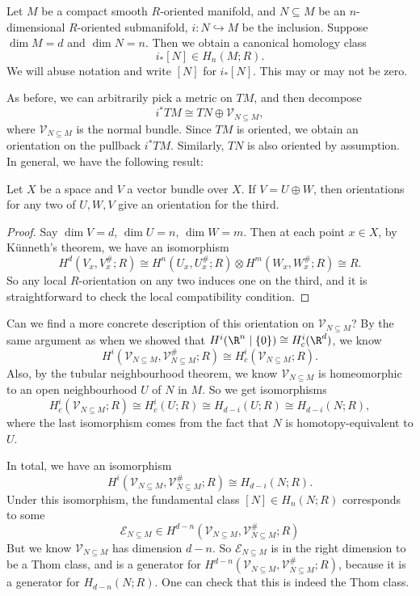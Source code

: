 \documentclass[a4paper]{article}
\theoremstyle{definition}
\begin{document}
Let $M$ be a compact smooth $R$-oriented manifold, and $N \subseteq M$ be an $n$-dimensional $R$-oriented submanifold, $i: N \hookrightarrow M$ be the inclusion. Suppose $\dim M = d$ and $\dim N = n$. Then we obtain a canonical homology class
\[
  i_*[N] \in H_n(M; R).
\]
We will abuse notation and write $[N]$ for $i_* [N]$. This may or may not be zero.

As before, we can arbitrarily pick a metric on $TM$, and then decompose
\[
  i^*TM \cong TN \oplus \mathcal{V}_{N \subseteq M},
\]
where $\mathcal{V}_{N\subseteq M}$ is the normal bundle. Since $TM$ is oriented, we obtain an orientation on the pullback $i^*TM$. Similarly, $TN$ is also oriented by assumption. In general, we have the following result:
\begin{lemma}
  Let $X$ be a space and $V$ a vector bundle over $X$. If $V = U \oplus W$, then orientations for any two of $U, W, V$ give an orientation for the third.
\end{lemma}

\begin{proof}
  Say $\dim V = d$, $\dim U = n$, $\dim W = m$. Then at each point $x \in X$, by K\"unneth's theorem, we have an isomorphism
  \[
    H^d(V_x, V_x^\#; R) \cong H^n(U_x, U_x^\#; R) \otimes H^m(W_x, W_x^\#; R) \cong R.
  \]
  So any local $R$-orientation on any two induces one on the third, and it is straightforward to check the local compatibility condition.
\end{proof}

Can we find a more concrete description of this orientation on $\mathcal{V}_{N \subseteq M}$? By the same argument as when we showed that $H^i(\R^n \mid \{0\}) \cong H_c^i(\R^d)$, we know
\[
  H^i(\mathcal{V}_{N \subseteq M}, \mathcal{V}_{N \subseteq M}^\#; R) \cong H_c^i(\mathcal{V}_{N \subseteq M}; R).
\]
Also, by the tubular neighbourhood theorem, we know $\mathcal{V}_{N \subseteq M}$ is homeomorphic to an open neighbourhood $U$ of $N$ in $M$. So we get isomorphisms
\[
  H^i_c(\mathcal{V}_{N \subseteq M}; R) \cong H_c^i(U; R) \cong H_{d - i}(U; R) \cong H_{d - i}(N; R),
\]
where the last isomorphism comes from the fact that $N$ is homotopy-equivalent to $U$.

In total, we have an isomorphism
\[
  H^i(\mathcal{V}_{N \subseteq M}, \mathcal{V}_{N \subseteq M}^\#; R) \cong H_{d - i}(N; R).
\]
Under this isomorphism, the fundamental class $[N] \in H_n(N; R)$ corresponds to some
\[
  \mathcal{E}_{N \subseteq M} \in H^{d - n}(\mathcal{V}_{N \subseteq M}, \mathcal{V}_{N \subseteq M}^\#; R)
\]
But we know $\mathcal{V}_{N \subseteq M}$ has dimension $d - n$. So $\mathcal{E}_{N \subseteq M}$ is in the right dimension to be a Thom class, and is a generator for $H^{d - n}(\mathcal{V}_{N \subseteq M}, \mathcal{V}_{N \subseteq M}^\#; R)$, because it is a generator for $H_{d - n}(N; R)$. One can check that this is indeed the Thom class.
\end{document}
